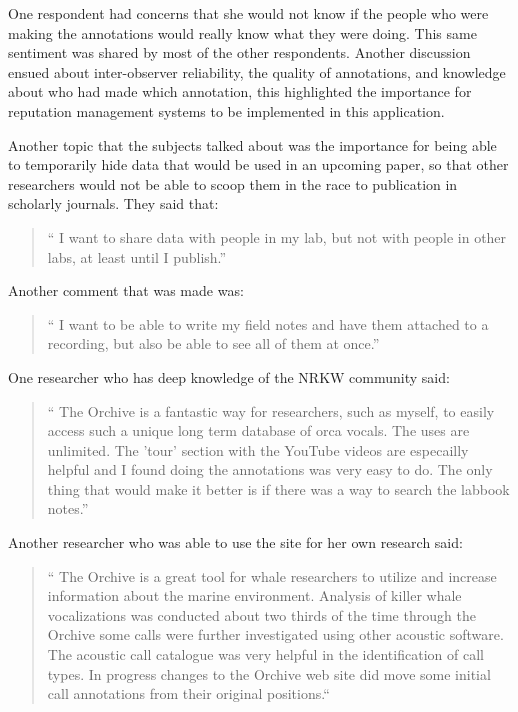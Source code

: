 \documentclass[12pt,oneside]{book}
\begin{document}
One respondent had concerns that she would not know if the people who
were making the annotations would really know what they were doing.
This same sentiment was shared by most of the other respondents.
Another discussion ensued about inter-observer reliability, the
quality of annotations, and knowledge about who had made which
annotation, this highlighted the importance for reputation management
systems to be implemented in this application.

Another topic that the subjects talked about was the importance for
being able to temporarily hide data that would be used in an upcoming
paper, so that other researchers would not be able to scoop them in
the race to publication in scholarly journals.  They said that:

\begin{quote}
`` I want to share data with people in my lab, but not with people in
  other labs, at least until I publish.''
\end{quote}

Another comment that was made was:

\begin{quote}
`` I want to be able to write my field notes and have them attached to
  a recording, but also be able to see all of them at once.''
\end{quote}


One researcher who has deep knowledge of the NRKW community said:

\begin{quote}
`` The Orchive is a fantastic way for researchers, such as myself, to
  easily access such a unique long term database of orca vocals. The
  uses are unlimited. The 'tour' section with the YouTube videos are
  especailly helpful and I found doing the annotations was very easy
  to do. The only thing that would make it better is if there was a
  way to search the labbook notes.''
\end{quote}

Another researcher who was able to use the site for her own research
said:

\begin{quote}
`` The Orchive is a great tool for whale researchers to utilize and
  increase information about the marine environment.  Analysis of
  killer whale vocalizations was conducted about two thirds of the
  time through the Orchive some calls were further investigated using
  other acoustic software. The acoustic call catalogue was very
  helpful in the identification of call types.  In progress changes to
  the Orchive web site did move some initial call annotations from
  their original positions.``
\end{quote}
\end{document}
